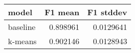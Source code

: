 \begin{tabular}{lrr}
\toprule
 model    &   F1 mean &   F1 stddev \\
\midrule
 baseline &  0.898961 &   0.0129641 \\
 k-means  &  0.902146 &   0.0128943 \\
\bottomrule
\end{tabular}